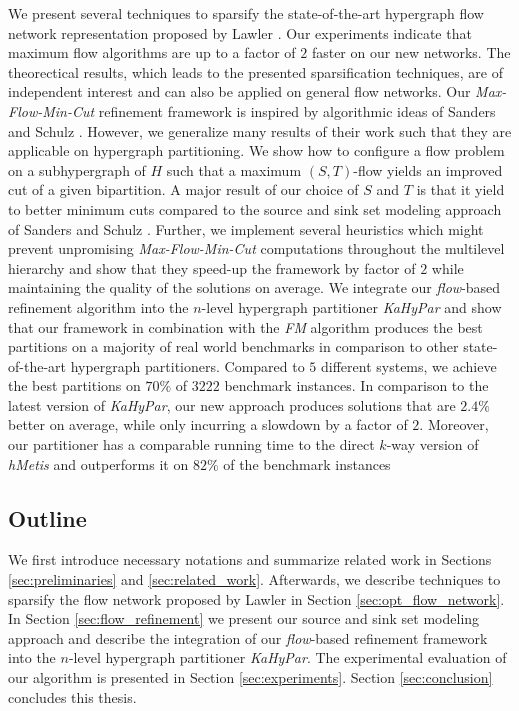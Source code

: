 We present several techniques to sparsify the state-of-the-art hypergraph flow network
representation proposed by Lawler \cite{lawler1973}. Our experiments indicate that
maximum flow algorithms are up to a factor of $2$ faster on our new networks. The
theorectical results, which leads to the presented sparsification techniques, are
of independent interest and can also be applied on general flow networks.
Our \emph{Max-Flow-Min-Cut} refinement framework is inspired by algorithmic ideas of
Sanders and Schulz \cite{sanders2011engineering}. However, we generalize many results of
their work such that they are applicable on hypergraph partitioning. We show how to 
configure a flow problem on a subhypergraph of $H$ such that a 
maximum $(S,T)$-flow yields an improved cut of a given bipartition. 
A major result of our choice of $S$ and $T$ is that it yield to better minimum cuts compared 
to the source and sink set modeling approach of Sanders and Schulz \cite{sanders2011engineering}.
Further, we implement several heuristics which might prevent unpromising \emph{Max-Flow-Min-Cut} computations 
throughout the multilevel hierarchy and show that they speed-up the framework by factor
of $2$ while maintaining the quality of the solutions on average.
We integrate our \emph{flow}-based refinement algorithm into the $n$-level hypergraph partitioner
\emph{KaHyPar} and show that our framework in combination with the
\emph{FM} algorithm produces the best partitions on a majority of real world benchmarks
in comparison to other state-of-the-art hypergraph partitioners. 
Compared to $5$ different systems, we achieve the best partitions on $70\%$ 
of $3222$ benchmark instances. In comparison to the 
latest version of \emph{KaHyPar}, our new approach produces solutions that are
$2.4\%$ better on average, while only incurring a slowdown by a factor of $2$.
Moreover, our partitioner has a comparable running time to the direct $k$-way
version of \emph{hMetis} and outperforms it on $82\%$ of the benchmark instances

\subsection{Outline}

We first introduce necessary notations and summarize related work in Sections \ref{sec:preliminaries}
and \ref{sec:related_work}. Afterwards, we describe techniques to sparsify the flow network
proposed by Lawler \cite{lawler1973} in Section \ref{sec:opt_flow_network}. In Section
\ref{sec:flow_refinement} we present our source and sink set modeling
approach and describe the integration of our \emph{flow}-based refinement framework into
the $n$-level hypergraph partitioner \emph{KaHyPar}. The experimental evaluation of our algorithm
is presented in Section \ref{sec:experiments}. Section \ref{sec:conclusion} concludes this thesis.